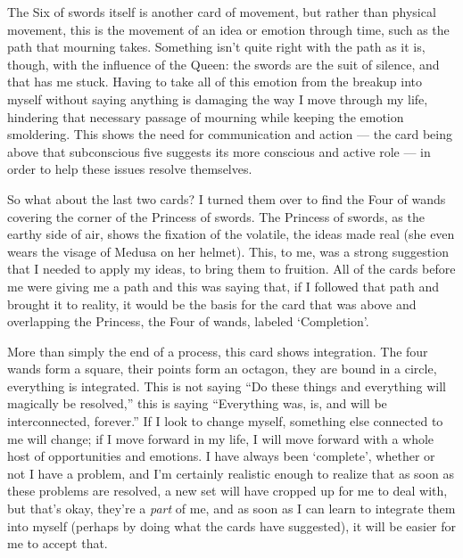 The Six of swords itself is another card of movement, but rather than
physical movement, this is the movement of an idea or emotion through
time, such as the path that mourning takes.  Something isn't quite right
with the path as it is, though, with the influence of the Queen: the
swords are the suit of silence, and that has me stuck.  Having to take
all of this emotion from the breakup into myself without saying anything
is damaging the way I move through my life, hindering that necessary
passage of mourning while keeping the emotion smoldering.  This shows
the need for communication and action --- the card being above that
subconscious five suggests its more conscious and active role --- in
order to help these issues resolve themselves.

So what about the last two cards?  I turned them over to find the Four
of wands covering the corner of the Princess of swords.  The Princess of
swords, as the earthy side of air, shows the fixation of the volatile,
the ideas made real (she even wears the visage of Medusa on her helmet).
This, to me, was a strong suggestion that I needed to apply my ideas, to
bring them to fruition.  All of the cards before me were giving me a
path and this was saying that, if I followed that path and brought it to
reality, it would be the basis for the card that was above and
overlapping the Princess, the Four of wands, labeled `Completion'. 

More than simply the end of a process, this card shows integration.  The
four wands form a square, their points form an octagon, they are bound
in a circle, everything is integrated.  This is not saying ``Do these
things and everything will magically be resolved,'' this is saying
``Everything was, is, and will be interconnected, forever.''  If I look
to change myself, something else connected to me will change; if I move
forward in my life, I will move forward with a whole host of
opportunities and emotions.  I have always been `complete', whether or
not I have a problem, and I'm certainly realistic enough to realize that
as soon as these problems are resolved, a new set will have cropped up
for me to deal with, but that's okay, they're a \emph{part} of me, and
as soon as I can learn to integrate them into myself (perhaps by doing
what the cards have suggested), it will be easier for me to accept that.
